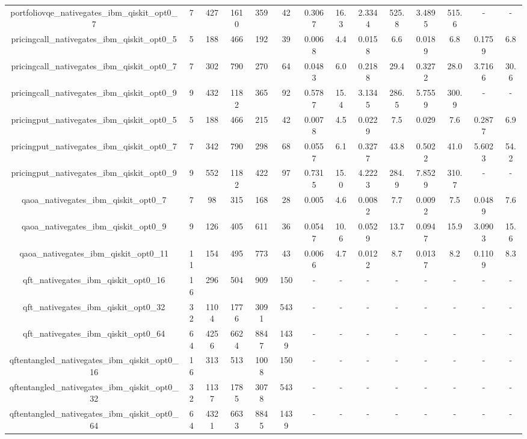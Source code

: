 \begin{table}[htb]
{\begin{tabular}{|c|c|c|c|c|c|c|c|c|c|c|c|c|c|}
portfoliovqe\_nativegates\_ibm\_qiskit\_opt0\_7 & 7 & 427 & 1610 & 359 & 42 & 0.3067 & 16.3 & 2.3344 & 525.8 & 3.4895 & 515.6 & - & - \\ 
pricingcall\_nativegates\_ibm\_qiskit\_opt0\_5 & 5 & 188 & 466 & 192 & 39 & 0.0068 & 4.4 & 0.0158 & 6.6 & 0.0189 & 6.8 & 0.1759 & 6.8 \\ 
pricingcall\_nativegates\_ibm\_qiskit\_opt0\_7 & 7 & 302 & 790 & 270 & 64 & 0.0483 & 6.0 & 0.2188 & 29.4 & 0.3272 & 28.0 & 3.7166 & 30.6 \\ 
pricingcall\_nativegates\_ibm\_qiskit\_opt0\_9 & 9 & 432 & 1182 & 365 & 92 & 0.5787 & 15.4 & 3.1345 & 286.5 & 5.7559 & 300.9 & - & - \\ 
pricingput\_nativegates\_ibm\_qiskit\_opt0\_5 & 5 & 188 & 466 & 215 & 42 & 0.0078 & 4.5 & 0.0229 & 7.5 & 0.029 & 7.6 & 0.2877 & 6.9 \\ 
pricingput\_nativegates\_ibm\_qiskit\_opt0\_7 & 7 & 342 & 790 & 298 & 68 & 0.0557 & 6.1 & 0.3277 & 43.8 & 0.5022 & 41.0 & 5.6023 & 54.2 \\ 
pricingput\_nativegates\_ibm\_qiskit\_opt0\_9 & 9 & 552 & 1182 & 422 & 97 & 0.7315 & 15.0 & 4.2223 & 284.9 & 7.8529 & 310.7 & - & - \\ 
qaoa\_nativegates\_ibm\_qiskit\_opt0\_7 & 7 & 98 & 315 & 168 & 28 & 0.005 & 4.6 & 0.0082 & 7.7 & 0.0092 & 7.5 & 0.0489 & 7.6 \\ 
qaoa\_nativegates\_ibm\_qiskit\_opt0\_9 & 9 & 126 & 405 & 611 & 36 & 0.0547 & 10.6 & 0.0529 & 13.7 & 0.0947 & 15.9 & 3.0903 & 15.6 \\ 
qaoa\_nativegates\_ibm\_qiskit\_opt0\_11 & 11 & 154 & 495 & 773 & 43 & 0.0066 & 4.7 & 0.0122 & 8.7 & 0.0137 & 8.2 & 0.1109 & 8.3 \\ 
qft\_nativegates\_ibm\_qiskit\_opt0\_16 & 16 & 296 & 504 & 909 & 150 & - & - & - & - & - & - & - & - \\ 
qft\_nativegates\_ibm\_qiskit\_opt0\_32 & 32 & 1104 & 1776 & 3091 & 543 & - & - & - & - & - & - & - & - \\ 
qft\_nativegates\_ibm\_qiskit\_opt0\_64 & 64 & 4256 & 6624 & 8847 & 1439 & - & - & - & - & - & - & - & - \\ 
qftentangled\_nativegates\_ibm\_qiskit\_opt0\_16 & 16 & 313 & 513 & 1008 & 150 & - & - & - & - & - & - & - & - \\ 
qftentangled\_nativegates\_ibm\_qiskit\_opt0\_32 & 32 & 1137 & 1785 & 3078 & 543 & - & - & - & - & - & - & - & - \\ 
qftentangled\_nativegates\_ibm\_qiskit\_opt0\_64 & 64 & 4321 & 6633 & 8845 & 1439 & - & - & - & - & - & - & - & - \\ 

\end{tabular}}
\end{table}
